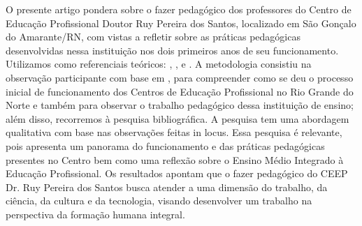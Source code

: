 \begin{refsection}
    \begin{galoResumo}
        O presente artigo pondera sobre o fazer pedagógico dos professores do Centro de Educação Profissional Doutor Ruy Pereira dos Santos, localizado em São Gonçalo do Amarante/RN, com vistas a refletir sobre as práticas pedagógicas desenvolvidas nessa instituição nos dois primeiros anos de seu funcionamento. Utilizamos como referenciais teóricos: \textcite{CIAVATTA2005formação}, \textcite{RAMOS2005Possibilidades,RAMOS2008Concepção}, \textcite{DANTE2010AlgumasPossibilidades} e \textcite{FREIRE1996Pedagogia}. A metodologia consistiu na observação participante com base em \textcite{MINAYO2007desafio}, para compreender como se deu o processo inicial de funcionamento dos Centros de Educação Profissional no Rio Grande do Norte e também para observar o trabalho pedagógico dessa instituição de ensino; além disso, recorremos à pesquisa bibliográfica. A pesquisa tem uma abordagem qualitativa com base nas observações feitas in locus. Essa pesquisa é relevante, pois apresenta um panorama do funcionamento e das práticas pedagógicas presentes no Centro bem como uma reflexão sobre o Ensino Médio Integrado à Educação Profissional.  Os resultados apontam que o fazer pedagógico do CEEP Dr. Ruy Pereira dos Santos busca atender a uma dimensão do trabalho, da ciência, da cultura e da tecnologia, visando desenvolver um trabalho na perspectiva da formação humana integral. 
    \end{galoResumo}
    
    
    \begin{otherlanguage}{spanish}


\end{otherlanguage}
\end{refsection}

